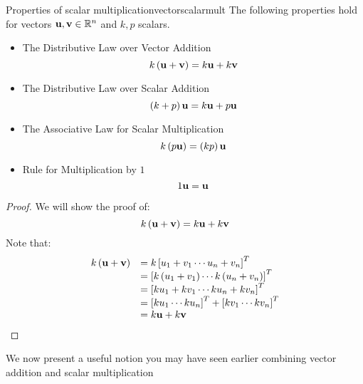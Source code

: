 \begin{theorem}{Properties of scalar multiplication}{vectorscalarmult}
The following properties hold for vectors ${\bf u},{\bf v}\in \mathbb{R}^{n}$ and $k,p $
scalars.
\begin{itemize}
\item The Distributive Law over Vector Addition
\begin{equation*}
k \left( {\bf u}+{\bf v}\right) = k{\bf u}+ k{\bf v}
\end{equation*}
\item The Distributive Law over Scalar Addition
\begin{equation*}
\left( k + p  \right){\bf u} = k {\bf u}+p {\bf u}
\end{equation*}
\item The Associative Law for Scalar Multiplication
\begin{equation*}
k \left( p {\bf u}\right) = \left(k p \right){\bf u}
\end{equation*}
\item Rule for Multiplication by $1$
\begin{equation*}
1{\bf u}={\bf u}  
\end{equation*}
\end{itemize}
\end{theorem}

\begin{proof}
We will show the proof of: 
\begin{equation*}
k \left( {\bf u}+{\bf v}\right) = k {\bf u}+ k {\bf v}
\end{equation*}
Note that:
\begin{equation*}
\begin{array}{ll}
k \left( {\bf u}+{\bf v}\right) & =k \left[u_{1}+v_{1} \cdots u_{n}+v_{n}\right]^T \\
& = \left[k \left( u_{1}+v_{1}\right) \cdots k \left( u_{n}+v_{n}\right) \right]^T \\
& = \left[k u_{1}+ k  v_{1} \cdots k u_{n}+ k v_{n}\right]^T \\
& = \left[k u_{1} \cdots k u_{n} \right]^T + \left[k v_{1} \cdots k v_{n} \right]^T \\
& = k {\bf u}+k {\bf v} \\
\end{array}
\end{equation*}
\end{proof}

We now present a useful notion you may have seen earlier combining vector addition and scalar multiplication

